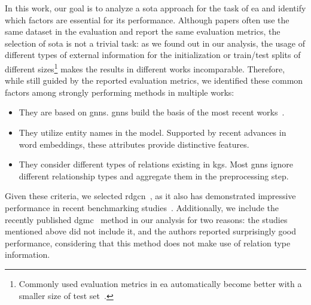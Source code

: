 \documentclass[runningheads]{llncs}
\begin{document}
In this work, our goal is to analyze a \gls{sota} approach for the task of \gls{ea} and identify which factors are essential for its performance. 
Although papers often use the same dataset in the evaluation and report the same evaluation metrics, the selection of \gls{sota} is not a trivial task:
as we found out in our analysis, the usage of different types of external information for the initialization or train/test splits of different sizes\footnote{Commonly used evaluation metrics in \acrshort{ea} automatically become better with a smaller size of test set~\cite{DBLP:journals/corr/abs-2002-06914}.} makes the results in different works incomparable. 
Therefore, while still guided by the reported evaluation metrics, we identified these common factors among strongly performing methods in multiple works:
\begin{itemize}
    \item They are based on \glspl{gnn}. \glspl{gnn} build the basis of the most recent works~\cite{DBLP:conf/emnlp/WangLLZ18,DBLP:conf/emnlp/LiCHSLC19,DBLP:conf/emnlp/ShiX19,DBLP:conf/emnlp/YangZSLLS19,DBLP:conf/ijcai/Ye0FZW19,DBLP:conf/acl/CaoLLLLC19,DBLP:conf/ijcai/ZhangSHCGQ19,DBLP:conf/ijcai/ZhuZ0TG19,DBLP:conf/wsdm/MaoWXLW20,DBLP:conf/aaai/SunW0CDZQ20,DBLP:conf/iclr/FeyL0MK20,DBLP:conf/ijcai/WuLF0Y019,DBLP:conf/acl/XuWYFSWY19,DBLP:conf/emnlp/WuLFWZ19,DBLP:journals/corr/abs-2010-04348}.
    \item They utilize entity names in the model. Supported by recent advances in word embeddings, these attributes provide distinctive features.
    \item They consider different types of relations existing in \glspl{kg}. Most \glspl{gnn} ignore different relationship types and aggregate them in the preprocessing step.
\end{itemize}
Given these criteria, we selected \acrfull{rdgcn}~\cite{DBLP:conf/ijcai/WuLF0Y019}, as it also has demonstrated impressive performance in recent benchmarking studies~\cite{DBLP:journals/pvldb/SunZHWCAL20,tkde/Zhao2020}.
Additionally, we include the recently published \acrfull{dgmc}~\cite{DBLP:conf/iclr/FeyL0MK20} method in our analysis for two reasons:
the studies mentioned above did not include it, and the authors reported surprisingly good performance, considering that this method does not make use of relation type information.
\end{document}
